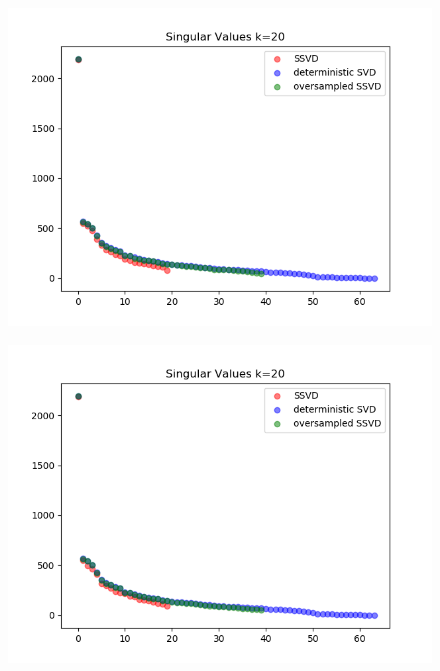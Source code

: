 \documentclass[paper=a4, fontsize=11pt]{scrartcl} %
\numberwithin{figure}{section} %
\numberwithin{table}{section} %
\begin{document}
\begin{figure}[H]

\includegraphics{sing_values_7.png}
\end{figure}

\begin{figure}[H]

\includegraphics{sing_values_8.png}
\end{figure}
\end{document}
